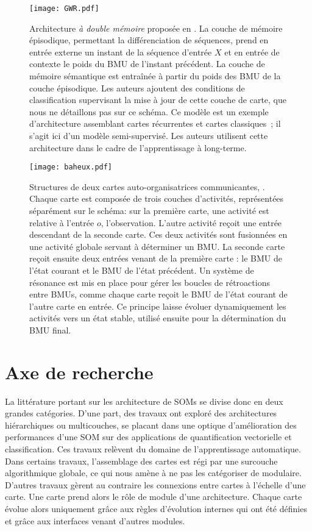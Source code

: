 \documentclass[../main]{subfiles}
\begin{document}
{\begin{figure}
    \centering
    \texttt{[image: GWR.pdf]}
    \caption{Architecture \emph{à double mémoire} proposée en \cite{parisiLL}. 
    La couche de mémoire épisodique, permettant la différenciation de séquences, prend en entrée externe un instant de la séquence d'entrée $X$ et en entrée de contexte le poids du BMU de l'instant précédent.
    La couche de mémoire sémantique est entraînée à partir du poids des BMU de la couche épisodique. Les auteurs ajoutent des conditions de classification supervisant la mise à jour de cette couche de carte, que nous ne détaillons pas sur ce schéma. Ce modèle est un exemple d'architecture assemblant cartes récurrentes et cartes classiques~; il s'agit ici d'un modèle semi-supervisé. Les auteurs utilisent cette architecture dans le cadre de l'apprentissage à long-terme.\label{fig:parisi}}
\end{figure}

\begin{figure}
    \centering
    \texttt{[image: baheux.pdf]}
    \caption{Structures de deux cartes auto-organisatrices communicantes, \cite{baheux_towards_2014}. Chaque carte est composée de trois couches d'activités, représentées séparément sur le schéma: sur la première carte, une activité est relative à l'entrée $o$, l'observation. L'autre activité reçoit une entrée descendant de la seconde carte. Ces deux activités sont fusionnées en une activité globale servant à déterminer un BMU. La seconde carte reçoit ensuite deux entrées venant de la première carte : le BMU de l'état courant et le BMU de l'état précédent. Un système de résonance est mis en place pour gérer les boucles de rétroactions entre BMUs, comme chaque carte reçoit le BMU de l'état courant de l'autre carte en entrée. Ce principe laisse évoluer dynamiquement les activités vers un état stable, utilisé ensuite pour la détermination du BMU final.\label{fig:baheux}}
\end{figure}


\section{Axe de recherche}

La littérature portant sur les architecture de SOMs se divise donc en deux grandes catégories. D'une part, des travaux ont exploré des architectures hiérarchiques ou multicouches, se placant dans une optique d'amélioration des performances d'une SOM sur des applications de quantification vectorielle et classification. Ces travaux relèvent du domaine de l'apprentissage automatique. 
Dans certains travaux, l'assemblage des cartes est régi par une surcouche algorithmique globale, ce qui nous amène à ne pas les catégoriser de modulaire. 
D'autres travaux gèrent au contraire les connexions entre cartes à l'échelle d'une carte. Une carte prend alors le rôle de module d'une architecture. Chaque carte évolue alors uniquement grâce aux règles d'évolution internes qui ont été définies et grâce aux interfaces venant d'autres modules.

}
\end{document}
